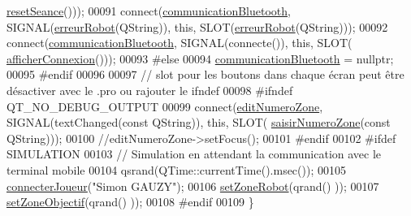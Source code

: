 \begin{DoxyCode}
      \hyperlink{class_ttpa_ihm_a521fea1cb4384157e5422a033e9a4d4f}{resetSeance}()));
00091     connect(\hyperlink{class_ttpa_ihm_a477c64fe999f4dec468fca9b04c5d842}{communicationBluetooth}, SIGNAL(\hyperlink{class_ttpa_ihm_a3a2380e2259f7b5bb1fd4d2ae470e06d}{erreurRobot}(QString)), \textcolor{keyword}{this}, 
      SLOT(\hyperlink{class_ttpa_ihm_a3a2380e2259f7b5bb1fd4d2ae470e06d}{erreurRobot}(QString)));
00092     connect(\hyperlink{class_ttpa_ihm_a477c64fe999f4dec468fca9b04c5d842}{communicationBluetooth}, SIGNAL(connecte()), \textcolor{keyword}{this}, SLOT(
      \hyperlink{class_ttpa_ihm_a0ad70018b8aff04ef55a258dfc78ec04}{afficherConnexion}()));
00093 \textcolor{preprocessor}{#else}
00094     \hyperlink{class_ttpa_ihm_a477c64fe999f4dec468fca9b04c5d842}{communicationBluetooth} = \textcolor{keyword}{nullptr};
00095 \textcolor{preprocessor}{#endif}
00096 
00097     \textcolor{comment}{// slot pour les boutons dans chaque écran peut être désactiver avec le .pro ou rajouter le ifndef}
00098 \textcolor{preprocessor}{#ifndef QT\_NO\_DEBUG\_OUTPUT}
00099     connect(\hyperlink{class_ttpa_ihm_a843f5742ec2289d08e2be94dda2c9128}{editNumeroZone}, SIGNAL(textChanged(\textcolor{keyword}{const} QString)), \textcolor{keyword}{this}, SLOT(
      \hyperlink{class_ttpa_ihm_a9b22616e3a4e52ad2ecfe1818d5fadb2}{saisirNumeroZone}(\textcolor{keyword}{const} QString)));
00100     \textcolor{comment}{//editNumeroZone->setFocus();}
00101 \textcolor{preprocessor}{#endif}
00102 \textcolor{preprocessor}{#ifdef SIMULATION}
00103     \textcolor{comment}{// Simulation en attendant la communication avec le terminal mobile}
00104     qsrand(QTime::currentTime().msec());
00105     \hyperlink{class_ttpa_ihm_a3b3eaf479e616df033680a4df42da3d7}{connecterJoueur}(\textcolor{stringliteral}{"Simon GAUZY"});
00106     \hyperlink{class_ttpa_ihm_abda1a93ec09ec404b129e08876faa5f8}{setZoneRobot}(qrand()%
      ));
00107     \hyperlink{class_ttpa_ihm_a3fd5b5d097f8a52df6fc8dd6d59b1374}{setZoneObjectif}(qrand()%
      ));
00108 \textcolor{preprocessor}{#endif}
00109 \}
\end{DoxyCode}
\mbox{\label{class_ttpa_ihm_ae436a774572b54dfa2dac8987fd3bb75}} 
